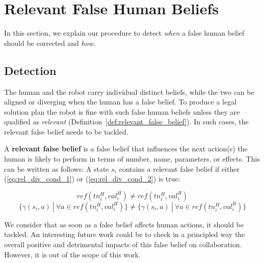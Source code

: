 {%
\section{Relevant False Human Beliefs}

In this section, we explain our procedure to detect \textit{when} a false human belief should be corrected and \textit{how}.


    \subsection{Detection}

The human and the robot carry individual distinct beliefs, while the two can be aligned or diverging when the human has a false belief. To produce a legal solution plan the robot is fine with such false human beliefs unless they are qualified as \textit{relevant} (Definition~\ref{def:relevant_false_belief}). In such cases, the relevant false belief needs to be tackled.

\begin{definition} \label{def:relevant_false_belief}

A \textbf{relevant false belief} is a false belief that influences the next action(s) the human is likely to perform in terms of number, name, parameters, or effects. This can be written as follows:
A state $s_i$ contains a relevant false belief if either (\ref{eq:rel_div_cond_1}) or (\ref{eq:rel_div_cond_2}) is true:

\begin{equation} \label{eq:rel_div_cond_1}
ref(tn^H_i, val^H_i) \neq ref(tn^H_i, val^R_i)
\end{equation}
\begin{equation} \label{eq:rel_div_cond_2}
\{ \gamma(s_i,a) ~|~ \forall a \in ref( tn^H_i, val^H_i ) \} \neq \{ \gamma(s_i,a) ~|~ \forall a \in ref( tn^H_i, val^R_i ) \}
\end{equation}
\end{definition}

We consider that as soon as a false belief affects human actions, it should be tackled. An interesting future work could be to check in a principled way the overall positive and detrimental impacts of this false belief on collaboration. However, it is out of the scope of this work.

}
